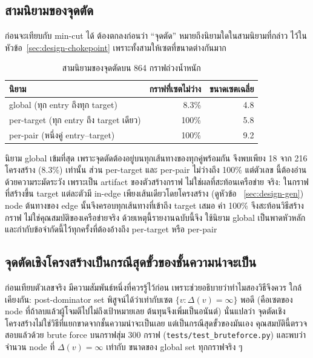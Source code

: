 \subsection{สามนิยามของจุดตัด}\label{sec:eval-cut-defs}

ก่อนจะเทียบกับ min-cut ได้ ต้องตกลงก่อนว่า ``จุดตัด'' หมายถึงนิยามใดในสามนิยามที่กล่าว
ไว้ในหัวข้อ~\ref{sec:design-chokepoint} เพราะทั้งสามให้เซตที่ขนาดต่างกันมาก

\begin{table}[H]
\centering
\caption{สามนิยามของจุดตัดบน 864 กราฟถ่วงน้ำหนัก}\label{tab:defs}
\small
\begin{tabular}{p{4.6cm}rr}
\toprule
นิยาม & กราฟที่เซตไม่ว่าง & ขนาดเซตเฉลี่ย \\
\midrule
global (ทุก entry ถึงทุก target) & 8.3\% & 4.8 \\
per-target (ทุก entry ถึง target เดียว) & 100\% & 5.8 \\
per-pair (หนึ่งคู่ entry--target) & 100\% & 9.2 \\
\bottomrule
\end{tabular}
\end{table}

นิยาม global เข้มที่สุด เพราะจุดตัดต้องอยู่บนทุกเส้นทางของทุกคู่พร้อมกัน จึงพบเพียง 18
จาก 216 โครงสร้าง (8.3\%) เท่านั้น ส่วน per-target และ per-pair ไม่ว่างถึง 100\% แต่ตัวเลข
นี้ต้องอ่านด้วยความระมัดระวัง เพราะเป็น artifact ของตัวสร้างกราฟ ไม่ใช่ผลที่สะท้อนเครือข่าย
จริง: ในกราฟที่สร้างขึ้น target แต่ละตัวมี in-edge เพียงเส้นเดียวโดยโครงสร้าง (ดูหัวข้อ~
\ref{sec:design-gen}) node ต้นทางของ edge นั้นจึงครอบทุกเส้นทางที่เข้าถึง target เสมอ
ค่า 100\% จึงสะท้อนวิธีสร้างกราฟ ไม่ใช่คุณสมบัติของเครือข่ายจริง ด้วยเหตุนี้รายงานฉบับนี้จึง
ใช้นิยาม global เป็นพาดหัวหลัก และกำกับข้อจำกัดนี้ไว้ทุกครั้งที่ต้องอ้างถึง per-target หรือ
per-pair

\subsection{จุดตัดเชิงโครงสร้างเป็นกรณีสุดขั้วของชั้นความน่าจะเป็น}\label{sec:eval-cut-extreme}

ก่อนเทียบตัวเลขจริง มีความสัมพันธ์หนึ่งที่ควรรู้ไว้ก่อน เพราะช่วยอธิบายว่าทำไมสองวิธีจึงควร
ใกล้เคียงกัน: post-dominator set พิสูจน์ได้ว่าเท่ากับเซต $\{v : \Delta(v) = \infty\}$ พอดี
(คือเซตของ node ที่ถ้าลบแล้วผู้โจมตีไปไม่ถึงเป้าหมายเลย ต้นทุนจึงเพิ่มเป็นอนันต์) นั่นแปลว่า
จุดตัดเชิงโครงสร้างไม่ใช่วิธีที่แยกขาดจากชั้นความน่าจะเป็นเลย แต่เป็นกรณีสุดขั้วของมันเอง
คุณสมบัตินี้ตรวจสอบแล้วด้วย brute force บนกราฟสุ่ม 300 กราฟ
(\texttt{tests/test\_bruteforce.py}) และพบว่าจำนวน node ที่ $\Delta(v)=\infty$ เท่ากับ
ขนาดของ global set ทุกกราฟจริง ๆ

